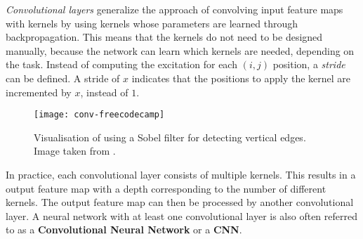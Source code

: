 \textit{Convolutional layers} generalize the approach of convolving input feature maps with kernels by using kernels whose parameters are learned through backpropagation.
This means that the kernels do not need to be designed manually, because the network can learn which kernels are needed, depending on the task.
Instead of computing the excitation for each $(i,j)$ position, a \textit{stride} can be defined.
A stride of $x$ indicates that the positions to apply the kernel are incremented by $x$, instead of $1$.

\begin{figure}[htb!]
    \centering
    \texttt{[image: conv-freecodecamp]}
    \caption{Visualisation of using a Sobel filter for detecting vertical edges. Image taken from \cite{dertat_applied_2017}.}
    \label{fig:conv-vis}
\end{figure}

In practice, each convolutional layer consists of multiple kernels.
This results in a output feature map with a depth corresponding to the number of different kernels.
The output feature map can then be processed by another convolutional layer.
A neural network with at least one convolutional layer is also often referred to as a \textbf{Convolutional Neural Network} or a \textbf{CNN}.




